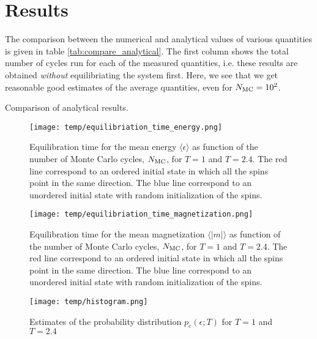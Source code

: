\section{Results}\label{sec:results}

The comparison between the numerical and analytical values of various quantities is given in table \ref{tab:compare_analytical}. The first column shows the total number of cycles run for each of the measured quantities, i.e. these results are obtained \textit{without} equilibriating the system first. Here, we see that we get reasonable good estimates of the average quantities, even for $N_\mathrm{MC}=10^2$.  

\begin{table}[!ht]
    
    \caption{Comparison of analytical results. }
    \label{tab:compare_analytical}
\end{table}

\begin{figure}[!ht]
    \texttt{[image: temp/equilibriation\_time\_energy.png]}
    \caption{Equilibration time for the mean energy $\langle \epsilon \rangle$ as function of the number of Monte Carlo cycles, $N_\mathrm{MC}$, for $T=1$ and $T=2.4$. The red line correspond to an ordered initial state in which all the spins point in the same direction. The blue line correspond to an unordered initial state with random initialization of the spins.}

    \label{fig:equil_energy}
\end{figure} 



\begin{figure}[!ht]
    \texttt{[image: temp/equilibriation\_time\_magnetization.png]}
    \caption{Equilibration time for the mean magnetization $\langle \vert m \vert \rangle$ as function of the number of Monte Carlo cycles, $N_\mathrm{MC}$, for $T=1$ and $T=2.4$. The red line correspond to an ordered initial state in which all the spins point in the same direction. The blue line correspond to an unordered initial state with random initialization of the spins.}
    \label{fig:equil_magn}
\end{figure}


\begin{figure}[!ht]
    \texttt{[image: temp/histogram.png]}
    \caption{Estimates of the probability distribution $p_e(\epsilon; T)$ for $T=1$ and $T=2.4$}
    \label{fig:histogram}
\end{figure}


